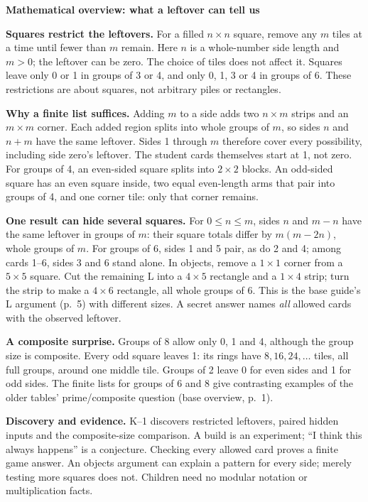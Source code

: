 \documentclass[11pt]{article}
\newcommand{\head}[1]{\par\textbf{\large #1}\par}
\begin{document}
\head{Mathematical overview: what a leftover can tell us}
\textbf{Squares restrict the leftovers.} For a filled $n\times n$ square, remove any $m$ tiles at a time until fewer than $m$ remain. Here $n$ is a whole-number side length and $m>0$; the leftover can be zero. The choice of tiles does not affect it. Squares leave only 0 or 1 in groups of 3 or 4, and only 0, 1, 3 or 4 in groups of 6. These restrictions are about squares, not arbitrary piles or rectangles.

\textbf{Why a finite list suffices.} Adding $m$ to a side adds two $n\times m$ strips and an $m\times m$ corner. Each added region splits into whole groups of $m$, so sides $n$ and $n+m$ have the same leftover. Sides 1 through $m$ therefore cover every possibility, including side zero's leftover. The student cards themselves start at 1, not zero. For groups of 4, an even-sided square splits into $2\times2$ blocks. An odd-sided square has an even square inside, two equal even-length arms that pair into groups of 4, and one corner tile: only that corner remains.

\textbf{One result can hide several squares.} For $0\le n\le m$, sides $n$ and $m-n$ have the same leftover in groups of $m$: their square totals differ by $m(m-2n)$, whole groups of $m$. For groups of 6, sides 1 and 5 pair, as do 2 and 4; among cards 1--6, sides 3 and 6 stand alone. In objects, remove a $1\times1$ corner from a $5\times5$ square. Cut the remaining L into a $4\times5$ rectangle and a $1\times4$ strip; turn the strip to make a $4\times6$ rectangle, all whole groups of 6. This is the base guide's L argument (p.\ 5) with different sizes. A secret answer names \emph{all} allowed cards with the observed leftover.

\textbf{A composite surprise.} Groups of 8 allow only 0, 1 and 4, although the group size is composite. Every odd square leaves 1: its rings have $8,16,24,\ldots$ tiles, all full groups, around one middle tile. Groups of 2 leave 0 for even sides and 1 for odd sides. The finite lists for groups of 6 and 8 give contrasting examples of the older tables' prime/composite question (base overview, p.\ 1).

\textbf{Discovery and evidence.} K--1 discovers restricted leftovers, paired hidden inputs and the composite-size comparison. A build is an experiment; ``I think this always happens'' is a conjecture. Checking every allowed card proves a finite game answer. An objects argument can explain a pattern for every side; merely testing more squares does not. Children need no modular notation or multiplication facts.
\end{document}
